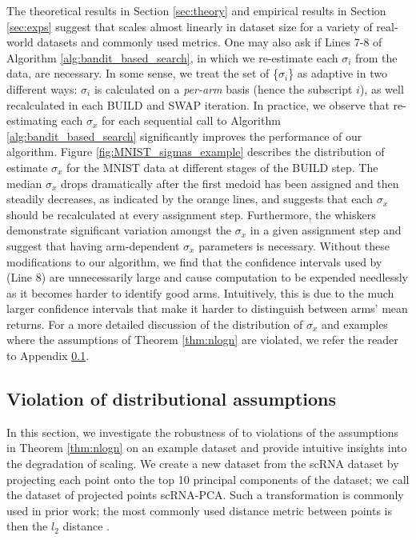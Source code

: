 The theoretical results in Section \ref{sec:theory} and empirical results in Section \ref{sec:exps} suggest that \algname scales almost linearly in dataset size for a variety of real-world datasets and commonly used metrics. One may also ask if Lines 7-8 of Algorithm \ref{alg:bandit_based_search}, in which we re-estimate each $\sigma_i$ from the data, are necessary.
In some sense, we treat the set of \{$\sigma_i$\} as adaptive in two different ways: $\sigma_i$ is calculated on a \textit{per-arm} basis (hence the subscript $i$), as well recalculated in each BUILD and SWAP iteration.
In practice, we observe that re-estimating each $\sigma_x$ for each sequential call to Algorithm \ref{alg:bandit_based_search} significantly improves the performance of our algorithm. Figure \ref{fig:MNIST_sigmas_example} describes the distribution of estimate $\sigma_x$ for the MNIST data at different stages of the BUILD step. The median $\sigma_x$ drops dramatically after the first medoid has been assigned and then steadily decreases, as indicated by the orange lines, and suggests that each $\sigma_x$ should be recalculated at every assignment step. Furthermore, the whiskers demonstrate significant variation amongst the $\sigma_x$ in a given assignment step and suggest that having arm-dependent $\sigma_x$ parameters is necessary. Without these modifications to our algorithm, we find that the confidence intervals used by \algname (Line 8) are unnecessarily large and cause computation to be expended needlessly as it becomes harder to identify good arms. Intuitively, this is due to the much larger confidence intervals that make it harder to distinguish between arms' mean returns.
For a more detailed discussion of the distribution of $\sigma_x$ and examples where the assumptions of Theorem \ref{thm:nlogn} are violated, we refer the reader to Appendix \ref{A3}.



\subsection{Violation of distributional assumptions}
\label{A3}

In this section, we investigate the robustness of \algname to violations of the assumptions in Theorem \ref{thm:nlogn} on an example dataset and provide intuitive insights into the degradation of scaling. We create a new dataset from the scRNA dataset by projecting each point onto the top 10 principal components of the dataset; we call the dataset of projected points scRNA-PCA. Such a transformation is commonly used in prior work; the most commonly used distance metric between points is then the $l_2$ distance \cite{scrnabestpractices}.

